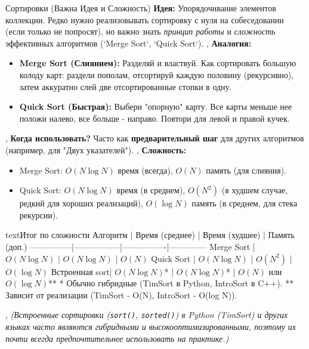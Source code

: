 \begin{myblock}{Сортировки (Важна Идея и Сложность)}
    \textbf{Идея:} Упорядочивание элементов коллекции. Редко нужно реализовывать сортировку с нуля на собеседовании (если только не попросят), но важно знать \textit{принцип работы} и \textit{сложность} эффективных алгоритмов (`Merge Sort`, `Quick Sort`). \sep
    \textbf{Аналогия:}
    \begin{itemize}[nosep, leftmargin=*]
        \item \textbf{Merge Sort (Слиянием):} Разделяй и властвуй. Как сортировать большую колоду карт: раздели пополам, отсортируй каждую половину (рекурсивно), затем аккуратно слей две отсортированные стопки в одну.
        \item \textbf{Quick Sort (Быстрая):} Выбери "опорную" карту. Все карты меньше нее положи налево, все больше - направо. Повтори для левой и правой кучек.
    \end{itemize} \sep
    \textbf{Когда использовать?} Часто как \textbf{предварительный шаг} для других алгоритмов (например, для "Двух указателей"). \sep
    \textbf{Сложность:}
    \begin{itemize}[nosep, leftmargin=*]
        \item Merge Sort: \textbf{$O(N \log N)$} время (всегда), \textbf{$O(N)$} память (для слияния).
        \item Quick Sort: \textbf{$O(N \log N)$} время (в среднем), \textbf{$O(N^2)$} (в худшем случае, редкий для хороших реализаций), \textbf{$O(\log N)$} память (в среднем, для стека рекурсии).
    \end{itemize}
    \begin{codebox}{text}{Итог по сложности}
    Алгоритм       | Время (среднее) | Время (худшее) | Память (доп.)
    ---------------|-----------------|----------------|--------------
    Merge Sort     | $O(N \log N)$   | $O(N \log N)$  | $O(N)$
    Quick Sort     | $O(N \log N)$   | $O(N^2)$       | $O(\log N)$
    Встроенная sort| $O(N \log N)$*  | $O(N \log N)$* | $O(N)$ или $O(\log N)$**
    * Обычно гибридные (TimSort в Python, IntroSort в C++).
    ** Зависит от реализации (TimSort - O(N), IntroSort - O(log N)).
    \end{codebox} \sep %
    \textit{(Встроенные сортировки (\texttt{sort()}, \texttt{sorted()}) в Python (TimSort) и других языках часто являются гибридными и высокооптимизированными, поэтому их почти всегда предпочтительнее использовать на практике.)}
\end{myblock}

